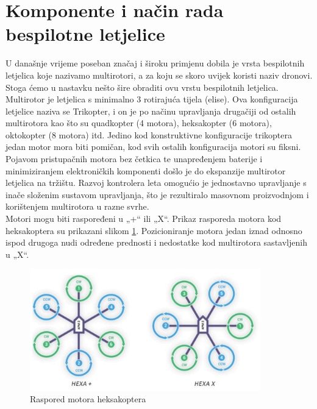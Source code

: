 \documentclass[times, utf8, diplomski]{fer}
\begin{document}
\section{Komponente i način rada bespilotne letjelice}
U današnje vrijeme poseban značaj i široku primjenu dobila je vrsta bespilotnih letjelica koje nazivamo multirotori,  a za koju  se skoro uvijek koristi naziv  dronovi.  Stoga ćemo  u nastavku nešto šire obraditi ovu vrstu bespilotnih letjelica.\\
Multirotor je letjelica s minimalno 3 rotirajuća tijela (elise). Ova konfiguracija letjelice naziva se Trikopter, i on je po načinu upravljanja drugačiji od ostalih multirotora kao što su quadkopter   (4   motora),   heksakopter   (6   motora),   oktokopter   (8   motora)   itd.   Jedino   kod konstruktivne konfiguracije  trikoptera  jedan  motor  mora  biti pomičan,  kod  svih  ostalih konfiguracija  motori  su  fiksni.  Pojavom pristupačnih motora bez četkica   te unapređenjem baterije  i minimiziranjem elektroničkih  komponenti  došlo  je  do  ekspanzije multirotor letjelica na tržištu. Razvoj kontrolera leta omogućio je jednostavno upravljanje s inače složenim sustavom upravljanja, što je rezultiralo masovnom proizvodnjom i korištenjem multirotora u razne svrhe.\\
Motori mogu biti raspoređeni u „+“ ili „X“. Prikaz rasporeda motora kod heksakoptera su prikazani slikom \ref{fig:rasporedMotora}. Pozicioniranje  motora  jedan  iznad  odnosno ispod drugoga nudi određene prednosti i nedostatke  kod  multirotora  sastavljenih  u  „X“.
\begin{figure}[h]
\centering
\includegraphics[width=10cm]{img/raspored.jpg}
\caption{Raspored motora heksakoptera\protect\footnotemark}
\label{fig:rasporedMotora}
\end{figure}
\end{document}
